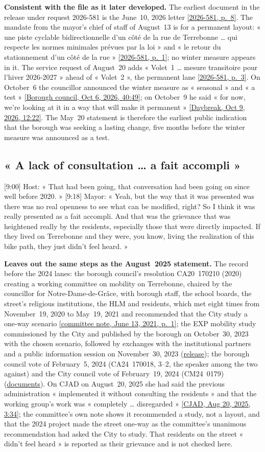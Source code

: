 \documentclass[11pt,letterpaper]{article}
\newcommand{\repourl}{https://github.com/OpenMobilityData/Terrebonne-open-sources}
\newcommand{\doc}[2]{\href{\repourl/blob/main/#1}{#2}}
\newcommand{\pagesurl}{https://openmobilitydata.github.io/Terrebonne-access-requests}
\newcommand{\cliptime}[1]{\textsf{\small[#1]}}
\newcommand{\pgl}[2]{\href{\pagesurl/2026-581/raw/01_emails_mandate_counts.pdf\#page=#1}{\textsf{\small[2026-581, p.~#2]}}}
\newcommand{\pg}[1]{\pgl{#1}{#1}}
\newcommand{\wc}[1]{\href{\repourl/blob/main/2020-2021-working-committee/raw/Comite_de_travail_recommandations_2021-06-13.pdf}{\textsf{\small[committee note, June 13, 2021, p.~#1]}}}
\newcommand{\octsix}[2]{\href{\repourl/blob/main/2026-10-06-borough-council/derived/#1}{\textsf{\small[Borough council, Oct 6, 2026, #2]}}}
\newcommand{\dbocttime}[1]{\href{\repourl/blob/main/2026-cbc-daybreak-interview/}{\textsf{\small[Daybreak, Oct 9, 2026, #1]}}}
\newcommand{\cjad}[1]{\href{\repourl/blob/main/2025-08-20-cjad-valenzuela/derived/2025-08-20_CJAD_Valenzuela_transcript_en.md}{\textsf{\small[CJAD, Aug 20, 2025, #1]}}}
\begin{document}
\textbf{Consistent with the file as it later developed.} The earliest
document in the release under request 2026-581 is the June~10, 2026 letter
\pg{8}. The mandate from the mayor's chief of staff of August~13 is for a
permanent layout: « une piste cyclable bidirectionnelle d'un côté de la rue
de Terrebonne … qui respecte les normes minimales prévues par la loi » and
« le retour du stationnement d'un côté de la rue » \pg{1}; no winter measure
appears in it. The service request of August~20 adds « Volet~1 … mesure
transitoire pour l'hiver 2026-2027 » ahead of « Volet~2 », the permanent
lane \pg{3}. On October~6 the councillor announced the winter measure as
« seasonal » and « a test » \octsix{2026-10-06_01.md}{40:49}; on
October~9 he said « for now, we're looking at it in a way that will make it
permanent » \dbocttime{12:22}. The May~20 statement is therefore the
earliest public indication that the borough was seeking a lasting change,
five months before the winter measure was announced as a test.

\subsection{« A lack of consultation … a fait accompli »}

\cliptime{9:00} Host: « That had been going, that conversation had been
going on since well before 2020. » \cliptime{9:18} Mayor: « Yeah, but the
way that it was presented was there was no real openness to see what can be
modified, right? So I think it was really presented as a fait accompli. And
that was the grievance that was heightened really by the residents,
especially those that were directly impacted. If they lived on Terrebonne
and they were, you know, living the realization of this bike path, they just
didn't feel heard. »

\textbf{Leaves out the same steps as the August~2025 statement.} The
record before the 2024 lanes: the borough council's resolution CA20~170210
(2020) creating a working committee on mobility on Terrebonne, chaired by the
councillor for Notre-Dame-de-Grâce, with borough staff, the school boards,
the street's religious institutions, the HLM and residents, which met eight
times from November~19, 2020 to May~19, 2021 and recommended that the City
study a one-way scenario \wc{1}; the EXP mobility study commissioned by the
City and published by the borough on October~30, 2023 with the chosen
scenario, followed by exchanges with the institutional partners and a public
information session on November~30, 2023
(\doc{2023-exp-mobility-study/}{release}); the borough council vote of
February~5, 2024 (CA24~170018, 3--2, the speaker among the two against) and
the City council vote of February~19, 2024 (CM24~0179)
(\doc{2024-project-approval/}{documents}). On CJAD on August~20, 2025 she
had said the previous administration « implemented it without consulting the
residents » and that the working group's work was « completely …
disregarded » \cjad{3:34}; the committee's own note shows it recommended a
study, not a layout, and that the 2024 project made the street one-way as
the committee's unanimous recommendation had asked the City to study. That
residents on the street « didn't feel heard » is reported as their grievance
and is not checked here.
\end{document}
